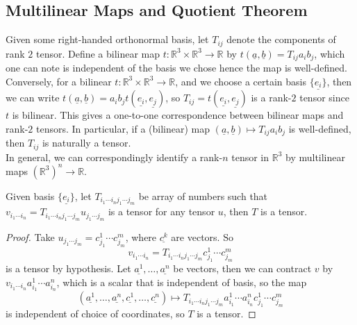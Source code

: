 \subsection{Multilinear Maps and Quotient Theorem}
Given some right-handed orthonormal basis, let $T_{ij}$ denote the components of rank $2$ tensor.
Define a bilinear map $t:\mathbb R^3\times\mathbb R^3\to\mathbb R$ by $t(\underline{a},\underline{b})=T_{ij}a_ib_j$, which one can note is independent of the basis we chose hence the map is well-defined.
Conversely, for a bilinear $t:\mathbb R^3\times\mathbb R^3\to\mathbb R$, and we choose a certain basis $\{\underline{e_i}\}$, then we can write $t(\underline{a},\underline{b})=a_ib_jt(\underline{e_i},\underline{e_j})$, so $T_{ij}=t(\underline{e_i},\underline{e_j})$ is a rank-$2$ tensor since  $t$ is bilinear.
This gives a one-to-one correspondence between bilinear maps and rank-$2$ tensors.
In particular, if a (bilinear) map $(\underline{a},\underline{b})\mapsto T_{ij}a_ib_j$ is well-defined, then $T_{ij}$ is naturally a tensor.\\
In general, we can correspondingly identify a rank-$n$ tensor in $\mathbb R^3$ by multilinear maps $(\mathbb R^3)^n\to\mathbb R$.
\begin{proposition}
    Given basis $\{\underline{e_i}\}$, let $T_{i_1\cdots i_nj_1\cdots j_m}$ be array of numbers such that $v_{i_1\cdots i_n}=T_{i_1\cdots i_nj_1\cdots j_m}u_{j_1\cdots j_m}$ is a tensor for any tensor $u$, then $T$ is a tensor.
\end{proposition}
\begin{proof}
    Take $u_{j_1\cdots j_m}=c^1_{j_1}\cdots c^m_{j_m}$, where $\underline{c^k}$ are vectors.
    So
    $$v_{i_1\cdots i_n}=T_{i_1\cdots i_nj_1\cdots j_m}c^1_{j_1}\cdots c^m_{j_m}$$
    is a tensor by hypothesis.
    Let $\underline{a^1},\ldots,\underline{a^n}$ be vectors, then we can contract $v$ by $v_{i_1\cdots i_n}a_{i_1}^1\cdots a_{i_n}^n$, which is a scalar that is independent of basis, so the map
    $$(\underline{a^1},\ldots,\underline{a^n},\underline{c^1},\ldots,\underline{c^n})\mapsto T_{i_1\cdots i_nj_1\cdots j_m}a_{i_1}^1\cdots a_{i_n}^nc_{j_1}^1\cdots c_{j_m}^m$$
    is independent of choice of coordinates, so $T$ is a tensor.
\end{proof}
